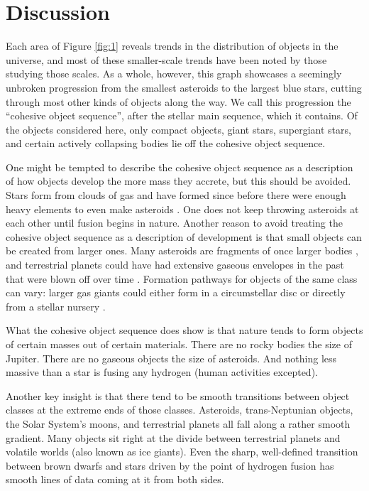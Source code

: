 \documentclass[twocolumn,linenumbers]{aastex631}
\begin{document}
\section{Discussion} \label{sec:intro}

Each area of Figure \ref{fig:1} reveals trends in the distribution of objects in the universe, and most of these smaller-scale trends have been noted by those studying those scales. As a whole, however, this graph showcases a seemingly unbroken progression from the smallest asteroids to the largest blue stars, cutting through most other kinds of objects along the way. We call this progression the ``cohesive object sequence'', after the stellar main sequence, which it contains. Of the objects considered here, only compact objects, giant stars, supergiant stars, and certain actively collapsing bodies lie off the cohesive object sequence.

One might be tempted to describe the cohesive object sequence as a description of how objects develop the more mass they accrete, but this should be avoided. Stars form from clouds of gas and have formed since before there were enough heavy elements to even make asteroids \citep{Maio2010}. One does not keep throwing asteroids at each other until fusion begins in nature. Another reason to avoid treating the cohesive object sequence as a description of development is that small objects can be created from larger ones. Many asteroids are fragments of once larger bodies \citep{Scott2020}, and terrestrial planets could have had extensive gaseous envelopes in the past that were blown off over time \citep{Kurokawa2014}. Formation pathways for objects of the same class can vary: larger gas giants could either form in a circumstellar disc or directly from a stellar nursery \citep{Schlaufman2018}. 

What the cohesive object sequence does show is that nature tends to form objects of certain masses out of certain materials. There are no rocky bodies the size of Jupiter. There are no gaseous objects the size of asteroids. And nothing less massive than a star is fusing any hydrogen (human activities excepted). 

Another key insight is that there tend to be smooth transitions between object classes at the extreme ends of those classes. Asteroids, trans-Neptunian objects, the Solar System's moons, and terrestrial planets all fall along a rather smooth gradient. Many objects sit right at the divide between terrestrial planets and volatile worlds (also known as ice giants). Even the sharp, well-defined transition between brown dwarfs and stars driven by the point of hydrogen fusion \citep{Boetticher2017} has smooth lines of data coming at it from both sides.
\end{document}
